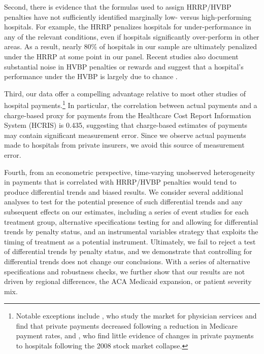 \documentclass[12pt]{article}
\begin{document}
Second, there is evidence that the formulas used to assign HRRP/HVBP penalties have not sufficiently identified marginally low- versus high-performing hospitals. For example, the HRRP penalizes hospitals for under-performance in any of the relevant conditions, even if hospitals significantly over-perform in other areas. As a result, nearly 80\% of hospitals in our sample are ultimately penalized under the HRRP at some point in our panel. Recent studies also document substantial noise in HVBP penalties or rewards and suggest that a hospital's performance under the HVBP is largely due to chance \citep{friedson2016,wilcock2018}.

Third, our data offer a compelling advantage relative to most other studies of hospital payments.\footnote{Notable exceptions include \cite{clemens2017}, who study the market for physician services and find that private payments decreased following a reduction in Medicare payment rates, and \cite{dranove2017}, who find little evidence of changes in private payments to hospitals following the 2008 stock market collapse.} In particular, the correlation between actual payments and a charge-based proxy for payments from the Healthcare Cost Report Information System (HCRIS) is 0.435, suggesting that charge-based estimates of payments may contain significant measurement error. Since we observe actual payments made to hospitals from private insurers, we avoid this source of measurement error.

Fourth, from an econometric perspective, time-varying unobserved heterogeneity in payments that is correlated with HRRP/HVBP penalties would tend to produce differential trends and biased results. We consider several additional analyses to test for the potential presence of such differential trends and any subsequent effects on our estimates, including a series of event studies for each treatment group, alternative specifications testing for and allowing for differential trends by penalty status, and an instrumental variables strategy that exploits the timing of treatment as a potential instrument. Ultimately, we fail to reject a test of differential trends by penalty status, and we demonstrate that controlling for differential trends does not change our conclusions. With a series of alternative specifications and robustness checks, we further show that our results are not driven by regional differences, the ACA Medicaid expansion, or patient severity mix.
\end{document}
